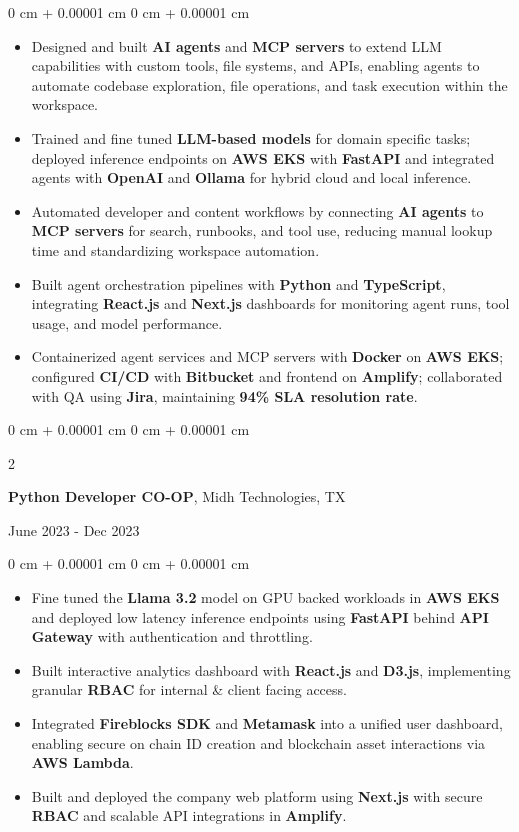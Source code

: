 \documentclass[10pt, letterpaper]{article}
\newenvironment{highlights}{
    \begin{itemize}[
        topsep=0.10 cm,
        parsep=0.10 cm,
        partopsep=0pt,
        itemsep=0pt,
        leftmargin=0 cm + 10pt
    ]
}{
    \end{itemize}
} %
\newenvironment{onecolentry}{
    \begin{adjustwidth}{
        0 cm + 0.00001 cm
    }{
        0 cm + 0.00001 cm
    }
}{
    \end{adjustwidth}
} %
\newenvironment{twocolentry}[2][]{
    \onecolentry
    \def\secondColumn{#2}
    \setcolumnwidth{\fill, 4.5 cm}
    \begin{paracol}{2}
}{
    \switchcolumn \raggedleft \secondColumn
    \end{paracol}
    \endonecolentry
} %
\begin{document}
\begin{onecolentry}
\begin{highlights}
	\item Designed and built \textbf{AI agents} and \textbf{MCP servers} to extend LLM capabilities with custom tools, file systems, and APIs, enabling agents to automate codebase exploration, file operations, and task execution within the workspace.
	\item Trained and fine tuned \textbf{LLM-based models} for domain specific tasks; deployed inference endpoints on \textbf{AWS EKS} with \textbf{FastAPI} and integrated agents with \textbf{OpenAI} and \textbf{Ollama} for hybrid cloud and local inference.
	\item Automated developer and content workflows by connecting \textbf{AI agents} to \textbf{MCP servers} for search, runbooks, and tool use, reducing manual lookup time and standardizing workspace automation.
	\item Built agent orchestration pipelines with \textbf{Python} and \textbf{TypeScript}, integrating \textbf{React.js} and \textbf{Next.js} dashboards for monitoring agent runs, tool usage, and model performance.
	\item Containerized agent services and MCP servers with \textbf{Docker} on \textbf{AWS EKS}; configured \textbf{CI/CD} with \textbf{Bitbucket} and frontend on \textbf{Amplify}; collaborated with QA using \textbf{Jira}, maintaining \textbf{94\% SLA resolution rate}.
\end{highlights}
\end{onecolentry}



\vspace{0.15 cm}
\begin{twocolentry}{
	June 2023 - Dec 2023
}
\textbf{Python Developer CO-OP}, Midh Technologies, TX
\end{twocolentry}

\begin{onecolentry}
\begin{highlights}
	\item Fine tuned the \textbf{Llama 3.2} model on GPU backed workloads in \textbf{AWS EKS} and deployed low latency inference endpoints using \textbf{FastAPI} behind \textbf{API Gateway} with authentication and throttling.
	\item Built interactive analytics dashboard with \textbf{React.js} and \textbf{D3.js}, implementing granular \textbf{RBAC} for internal \& client facing access.
	\item Integrated \textbf{Fireblocks SDK} and \textbf{Metamask} into a unified user dashboard, enabling secure on chain ID creation and blockchain asset interactions via \textbf{AWS Lambda}.
	\item Built and deployed the company web platform using \textbf{Next.js} with secure \textbf{RBAC} and scalable API integrations in \textbf{Amplify}.
\end{highlights}
\end{onecolentry}
\end{document}
